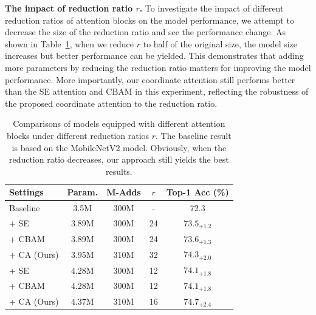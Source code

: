 \documentclass[final]{cvpr}
\newcommand{\myPara}[1]{\vspace{.05in}\noindent\textbf{#1.}}
\begin{document}
\myPara{The impact of reduction ratio $r$}
To investigate the impact of different reduction ratios of
attention blocks on the model performance, we attempt to 
decrease the size of the reduction ratio and see the performance
change.
%
As shown in Table~\ref{tab:reduction_ratio}, when we reduce
$r$ to half of the original size, the model size increases
but better performance can be yielded.
%
This demonstrates that adding more parameters by reducing the
reduction ratio matters for improving the model performance.
%
More importantly, our coordinate attention still performs better
than the SE attention and CBAM in this experiment, reflecting the
robustness of the proposed coordinate attention to the reduction ratio.


\begin{table}[t]
    \centering
    \small
    \setlength\tabcolsep{2.5mm}
    \renewcommand{\arraystretch}{1.1}
    \caption{Comparisons of models equipped with different
    attention blocks under different reduction ratios $r$. 
    The baseline result is based on the MobileNetV2 model.
    Obviously, when the reduction ratio decreases, 
    our approach still yields the best results.}
    \begin{tabular}{lcccc} \midrule[1pt]
    Settings & Param. & M-Adds & $r$ & Top-1 Acc (\%)  \\ \midrule[1pt]
    Baseline  &   3.5M      &  300M   & - &  72.3     \\
    + SE &   3.89M      &  300M & 24  &  $73.5_{+1.2}$     \\
    + CBAM &   3.89M      &  300M & 24  & $73.6_{+1.3}$     \\
    + CA (Ours) &   3.95M & 310M & 32 & $\mathbf{74.3_{+2.0}}$ \\ \midrule[1pt]
    + SE &   4.28M      &  300M & 12  &  $74.1_{+1.8}$     \\
    + CBAM &   4.28M      &  300M & 12  & $74.1_{+1.8}$     \\
    + CA (Ours) &   4.37M & 310M & 16 & $\mathbf{74.7_{+2.4}}$ \\
    \bottomrule[1pt]
    \end{tabular}
    \label{tab:reduction_ratio}
\end{table}
\end{document}
